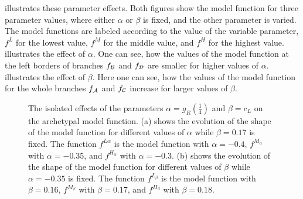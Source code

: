  illustrates these parameter effects.
Both figures show the model function for three parameter values, where either $\alpha$ or $\beta$ is fixed, and the other parameter is varied.
The model functions are labeled according to the value of the variable parameter, $f^L$ for the lowest value, $f^M$ for the middle value, and $f^H$ for the highest value.
 illustrates the effect of $\alpha$.
One can see, how the values of the model function at the left borders of branches $f_{\mathcal{B}}$ and $f_{\mathcal{D}}$ are smaller for higher values of $\alpha$.
 illustrates the effect of $\beta$.
Here one can see, how the values of the model function for the whole branches $f_{\mathcal{A}}$ and $f_{\mathcal{C}}$ increase for larger values of $\beta$.

\begin{figure}
	\centering
	\caption[The isolated effects of the parameters on the archetypal model function]{
		The isolated effects of the parameters $\alpha = g_R\left(\frac{1}{4}\right)$ and $\beta = c_L$ on the archetypal model function.
		(a) shows the evolution of the shape of the model function for different values of $\alpha$ while $\beta = 0.17$ is fixed.
		The function $f^{L\alpha}$ is the model function with $\alpha = -0.4$, $f^{M_\alpha}$ with $\alpha = -0.35$, and $f^{H_\alpha}$ with $\alpha = -0.3$.
		(b) shows the evolution of the shape of the model function for different values of $\beta$ while $\alpha = -0.35$ is fixed.
		The function $f^{L_\beta}$ is the model function with $\beta = 0.16$, $f^{M_\beta}$ with $\beta = 0.17$, and $f^{H_\beta}$ with $\beta = 0.18$.
	}
	\label{fig:setup.arch.paramfx}
\end{figure}

